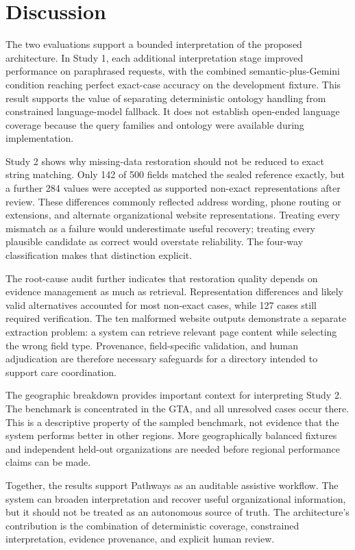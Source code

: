 \documentclass[journal,article,submit,moreauthors]{Definitions/mdpi}
\begin{document}
\section{Discussion}

The two evaluations support a bounded interpretation of the proposed architecture. In Study 1, each additional interpretation stage improved performance on paraphrased requests, with the combined semantic-plus-Gemini condition reaching perfect exact-case accuracy on the development fixture. This result supports the value of separating deterministic ontology handling from constrained language-model fallback. It does not establish open-ended language coverage because the query families and ontology were available during implementation.

Study 2 shows why missing-data restoration should not be reduced to exact string matching. Only 142 of 500 fields matched the sealed reference exactly, but a further 284 values were accepted as supported non-exact representations after review. These differences commonly reflected address wording, phone routing or extensions, and alternate organizational website representations. Treating every mismatch as a failure would underestimate useful recovery; treating every plausible candidate as correct would overstate reliability. The four-way classification makes that distinction explicit.

The root-cause audit further indicates that restoration quality depends on evidence management as much as retrieval. Representation differences and likely valid alternatives accounted for most non-exact cases, while 127 cases still required verification. The ten malformed website outputs demonstrate a separate extraction problem: a system can retrieve relevant page content while selecting the wrong field type. Provenance, field-specific validation, and human adjudication are therefore necessary safeguards for a directory intended to support care coordination.

The geographic breakdown provides important context for interpreting Study 2. The benchmark is concentrated in the GTA, and all unresolved cases occur there. This is a descriptive property of the sampled benchmark, not evidence that the system performs better in other regions. More geographically balanced fixtures and independent held-out organizations are needed before regional performance claims can be made.

Together, the results support Pathways as an auditable assistive workflow. The system can broaden interpretation and recover useful organizational information, but it should not be treated as an autonomous source of truth. The architecture’s contribution is the combination of deterministic coverage, constrained interpretation, evidence provenance, and explicit human review.
\end{document}
